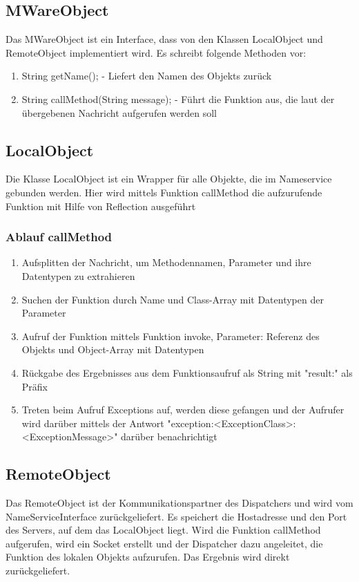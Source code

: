 \subsection{MWareObject}
Das MWareObject ist ein Interface, dass von den Klassen LocalObject und RemoteObject implementiert wird. Es schreibt folgende Methoden vor:
\begin{enumerate}
\item String getName(); - Liefert den Namen des Objekts zurück
\item String callMethod(String message); - Führt die Funktion aus, die laut der übergebenen Nachricht aufgerufen werden soll
\end{enumerate}

\subsection{LocalObject}
Die Klasse LocalObject ist ein Wrapper für alle Objekte, die im Nameservice gebunden werden. Hier wird mittels Funktion callMethod die aufzurufende Funktion mit Hilfe von Reflection ausgeführt

\subsubsection{Ablauf callMethod}
\begin{enumerate}
\item Aufsplitten der Nachricht, um Methodennamen, Parameter und ihre Datentypen zu extrahieren
\item Suchen der Funktion durch Name und Class-Array mit Datentypen der Parameter
\item Aufruf der Funktion mittels Funktion invoke, Parameter: Referenz des Objekts und Object-Array mit Datentypen
\item Rückgabe des Ergebnisses aus dem Funktionsaufruf als String mit "result:" als Präfix
\item Treten beim Aufruf Exceptions auf, werden diese gefangen und der Aufrufer wird darüber mittels der Antwort "exception:<ExceptionClass>:<ExceptionMessage>" darüber benachrichtigt 
\end{enumerate}

\subsection{RemoteObject}
Das RemoteObject ist der Kommunikationspartner des Dispatchers und wird vom NameServiceInterface zurückgeliefert. Es speichert die Hostadresse und den Port des Servers, auf dem das LocalObject liegt. Wird die Funktion callMethod aufgerufen, wird ein Socket erstellt und der Dispatcher dazu angeleitet, die Funktion des lokalen Objekts aufzurufen. Das Ergebnis wird direkt zurückgeliefert.

